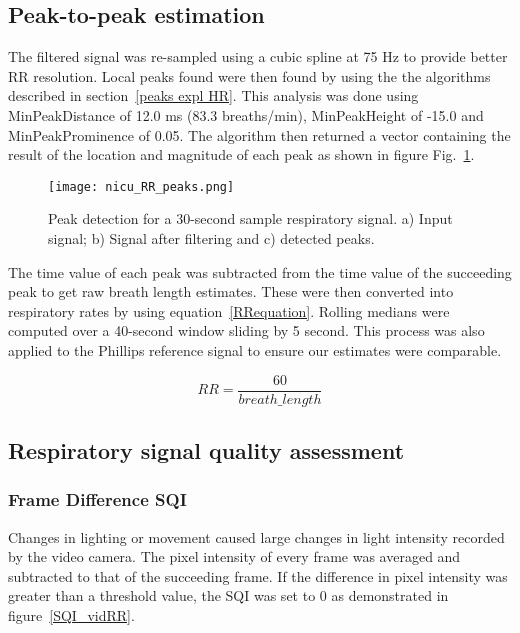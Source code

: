 \subsection{Peak-to-peak estimation}
    \label{RR_peaks2peak}
    
The filtered signal was re-sampled using a cubic spline at 75 Hz to provide better RR resolution. Local peaks found were then found by using the the algorithms described in section~\ref{peaks expl HR}. This analysis was done using MinPeakDistance of 12.0 ms (83.3 breaths/min), MinPeakHeight of -15.0 and MinPeakProminence of 0.05. The algorithm then returned a vector containing the result of the location and magnitude of each peak as shown in figure Fig.~\ref{RR_peaks}.

\begin{figure}[!ht]
\centering
\texttt{[image: nicu\_RR\_peaks.png]}
    \caption[Peak detection for a 30-second sample respiratory signal.] {Peak detection for a 30-second sample respiratory signal. a) Input signal; b) Signal after filtering and c) detected peaks.}
    \label{RR_peaks}
    \end{figure}
 
 The time value of each peak was subtracted from the time value of the succeeding peak to get raw breath length estimates. These were then converted into respiratory rates by using equation~\ref{RRequation}. Rolling medians were computed over a 40-second window sliding by 5 second. This process was also applied to the Phillips reference signal to ensure our estimates were comparable.
 
 \begin{equation}
 RR = \frac{60}{breath\_length}
\label{RRequation}
\end{equation}

\subsection{Respiratory signal quality assessment}
\label{rrsqi}
\subsubsection{Frame Difference SQI}

 Changes in lighting or movement caused large changes in light intensity recorded by the video camera. The pixel intensity of every frame was averaged and subtracted to that of the succeeding frame. If the difference in pixel intensity was greater than a threshold value, the SQI was set to 0 as demonstrated in figure~\ref{SQI_vidRR}.
 

